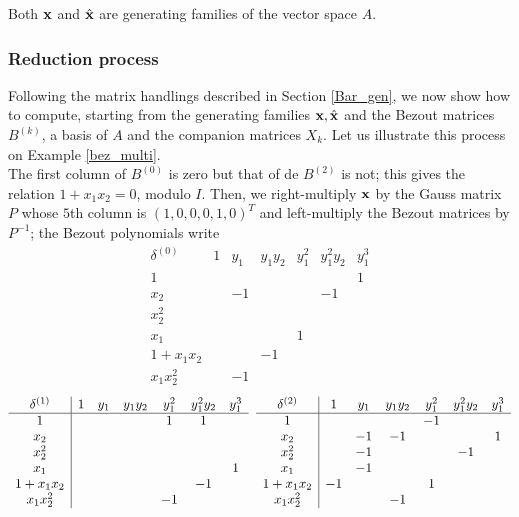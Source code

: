 \documentclass{standalone}
\begin{document}
\begin{prop}
Both $\bold{x}$ and $\hat{\bold{x}}$ are generating families of the vector space $A$.
\end{prop}

\subsubsection{Reduction process}
\label{sec:reduction_process}
Following the matrix handlings described in Section \ref{Bar_gen}, we now show how to compute, starting from the generating families $\bold{x}, \hat{\bold{x}}$ and the Bezout matrices $B^{(k)}$, a basis of $A$ and the companion matrices $X_k$.
Let us illustrate this process on Example \ref{bez_multi}.\\
The first column of $B^{(0)}$ is zero but that of de $B^{(2)}$ is not; this gives the relation $1 + x_1x_2 = 0$, modulo $I$. Then, we right-multiply $\bold{x}$ by the Gauss matrix $P$ whose $5$th column is $(1, 0, 0, 0, 1, 0)^{T}$ and left-multiply the Bezout matrices by $P^{-1}$; the Bezout polynomials write 
$$
\begin{array}{c|cccccc}
	\delta^{(0)} & 1 & y_1 & y_1y_2 & y_1^2 & y_1^2y_2 & y_1^3 \\
	\hline
	1 &  &  &  &  &  & 1\\
	x_2 &  & -1 &  &  & -1 & \\
	x_2^2 &  &  &  &  &  & \\
	x_1 &  &  &  & 1 &  & \\
	1+x_1x_2 &  &  & -1 &  &  & \\
	x_1x_2^2 &  & -1 &  &  &  &
\end{array}$$
$$
\begin{array}{c|cccccc}
	\delta^{(1)} & 1 & y_1 & y_1y_2 & y_1^2 & y_1^2y_2 & y_1^3 \\
	\hline
	1 &  &  &  & 1 & 1 & \\
	x_2 &  &  &  &  &  & \\
	x_2^2 &  &  &  &  &  & \\
	x_1 &  &  &  &  &  & 1\\
	1+x_1x_2 &  &  &  &  & -1 & \\
	x_1x_2^2 &  &  &  & -1 &  &
\end{array}
\hspace{0.2cm}
\begin{array}{c|cccccc}
	\delta^{(2)} & 1 & y_1 & y_1y_2 & y_1^2 & y_1^2y_2 & y_1^3 \\
	\hline
	1 &  &  &  & -1 &  & \\
	x_2 &  & -1 & -1 &  &  & 1\\
	x_2^2 &  & -1 &  &  & -1 & \\
	x_1 &  & -1 &  &  &  & \\
	1+x_1x_2 & -1 &  &  & 1 &  & \\
	x_1x_2^2 &  &  & -1 &  &  &
\end{array}
$$
\end{document}

